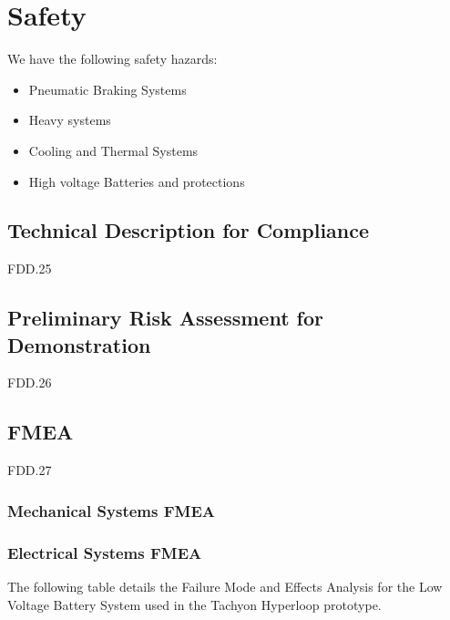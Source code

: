 \chapter{Safety}
We have the following safety hazards:
\begin{itemize}
    \item Pneumatic Braking Systems
    \item Heavy systems
    \item Cooling and Thermal Systems 
    \item High voltage Batteries and protections
\end{itemize}
\section{ Technical Description for Compliance}
FDD.25

\section{Preliminary Risk Assessment for Demonstration}
FDD.26 

\section{FMEA}
FDD.27 
\subsection{Mechanical Systems FMEA}
\subsection{Electrical Systems FMEA}

The following table details the Failure Mode and Effects Analysis for the Low Voltage Battery System used in the Tachyon Hyperloop prototype.

